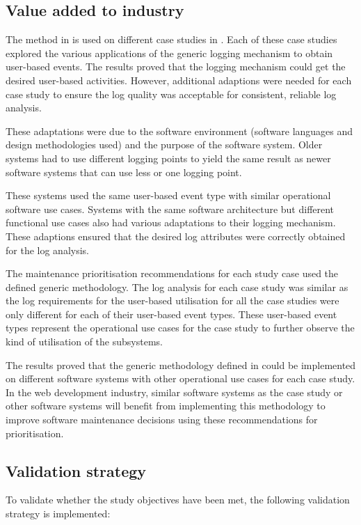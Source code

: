 \subsection{Value added to industry}
The method in  is used on different case studies in . Each of
these case studies explored the various applications of the generic logging mechanism to obtain
user-based events. The results proved that the logging mechanism could get the desired user-based
activities. However, additional adaptions were needed for each case study to ensure the log quality
was acceptable for consistent, reliable log analysis.\par These adaptations were due to the software
environment (software languages and design methodologies used) and the purpose of the software
system. Older systems had to use different logging points to yield the same result as newer software
systems that can use less or one logging point.\par These systems used the same user-based event
type with similar operational software use cases. Systems with the same software architecture but
different functional use cases also had various adaptations to their logging mechanism. These
adaptions ensured that the desired log attributes were correctly obtained for the log analysis. \par
The maintenance prioritisation recommendations for each study case used the defined generic
methodology. The log analysis for each case study was similar as the log requirements for the
user-based utilisation for all the case studies were only different for each of their user-based
event types. These user-based event types represent the operational use cases for the case study to
further observe the kind of utilisation of the subsystems. \par The results proved that the generic
methodology defined in  could be implemented on different software systems with
other operational use cases for each case study. In the web development industry, similar
software systems as the case study or other software systems will benefit from implementing this
methodology to improve software maintenance decisions using these recommendations for
prioritisation.

\subsection{Validation strategy}
To validate whether the study objectives have been met, the following validation strategy is
implemented:

